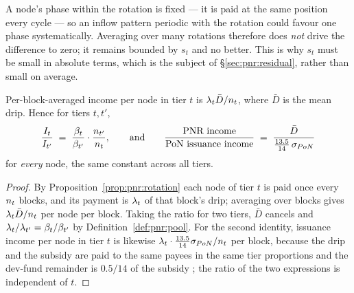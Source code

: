 \begin{remark}
\label{rem:pnr:phase}
A node's phase within the rotation is fixed --- it is paid at the same position every cycle --- so an
inflow pattern periodic with the rotation could favour one phase systematically. Averaging over many
rotations therefore does \emph{not} drive the difference to zero; it remains bounded by $s_t$ and no
better. This is why $s_t$ must be small in absolute terms, which is the subject of
\S\ref{sec:pnr:residual}, rather than small on average.
\end{remark}

\begin{proposition}
\label{prop:pnr:across}
Per-block-averaged \PNR income per node in tier $t$ is $\lambda_{t}\bar{D}/n_{t}$, where
$\bar{D}$ is the mean drip. Hence for tiers $t, t'$,
\[
  \frac{I_t}{I_{t'}} \;=\; \frac{\tbase{t}}{\tbase{t'}}\cdot\frac{\ncount{t'}}{\ncount{t}} ,
  \qquad\text{and}\qquad
  \frac{\text{\PNR income}}{\text{\PoN issuance income}}
  \;=\; \frac{\bar{D}}{\tfrac{13.5}{14}\,\subsidypon}
\]
for \emph{every} node, the same constant across all tiers.
\end{proposition}

\begin{proof}
By Proposition~\ref{prop:pnr:rotation} each node of tier $t$ is paid once every $n_{t}$ blocks,
and its payment is $\lambda_{t}$ of that block's drip; averaging over blocks gives
$\lambda_{t}\bar D/n_{t}$ per node per block. Taking the ratio for two tiers, $\bar D$
cancels and $\lambda_{t}/\lambda_{t'} = \beta_{t}/\beta_{t'}$ by
Definition~\ref{def:pnr:pool}. For the second identity, \PoN issuance income per node in tier $t$
is likewise $\lambda_{t}\cdot\tfrac{13.5}{14}\sigma_{PoN}/n_{t}$ per block, because the drip
and the subsidy are paid to the same payees in the same tier proportions and the dev-fund remainder
is $0.5/14$ of the subsidy ; the ratio of the two
expressions is independent of $t$.
\end{proof}

